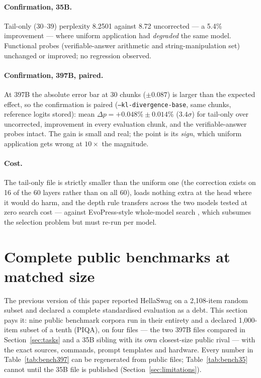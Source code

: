 \documentclass[10pt]{article} %
\begin{document}
\paragraph{Confirmation, 35B.} Tail-only (30--39) perplexity 8.2501 against 8.72
uncorrected --- a 5.4\% improvement --- where uniform application had \emph{degraded}
the same model. Functional probes (verifiable-answer arithmetic and
string-manipulation set) unchanged or improved; no regression observed.

\paragraph{Confirmation, 397B, paired.} At 397B the absolute error bar at 30 chunks
($\pm 0.087$) is larger than the expected effect, so the confirmation is paired
(\texttt{--kl-divergence-base}, same chunks, reference logits stored): mean
$\Delta p = +0.048\% \pm 0.014\%$ ($3.4\sigma$) for tail-only over uncorrected, improvement in
every evaluation chunk, and the verifiable-answer probes intact. The gain is
small and real; the point is its \emph{sign}, which uniform application gets
wrong at $10\times$ the magnitude.

\paragraph{Cost.} The tail-only file is strictly smaller than the uniform one (the
correction exists on 16 of the 60 layers rather than on all 60), loads
nothing extra at the head where it would do harm, and the depth rule
transfers across the two models tested at zero search cost --- against
EvoPress-style whole-model search \citep{sieberling2025evopress}, which subsumes the selection problem but
must re-run per model.

\section{Complete public benchmarks at matched size}
\label{sec:benchmarks}

The previous version of this paper reported HellaSwag on a 2,108-item random
subset and declared a complete standardised evaluation as a debt. This section
pays it: nine public benchmark corpora run in their entirety and a declared
1,000-item subset of a tenth (PIQA), on four files
--- the two 397B files compared in Section~\ref{sec:tasks} and a 35B sibling
with its own closest-size public rival --- with the exact sources, commands,
prompt templates and hardware. Every number in Table~\ref{tab:bench397} can be
regenerated from public files; Table~\ref{tab:bench35} cannot until the 35B
file is published (Section~\ref{sec:limitations}).
\end{document}

